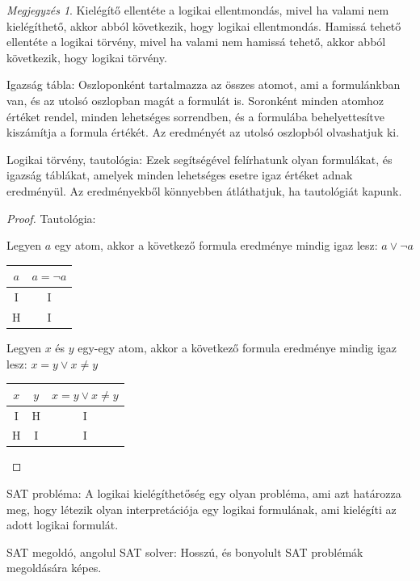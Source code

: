 \documentclass[
]{thesis-ekf}
\theoremstyle{definition}
\theoremstyle{remark}
\newtheorem{megjegyzes}[tetel]{Megjegyzés}
\begin{document}
	\begin{megjegyzes}
		Kielégítő ellentéte a logikai ellentmondás, mivel ha valami nem kielégíthető, akkor abból következik, hogy logikai ellentmondás.
		Hamissá tehető ellentéte a logikai törvény, mivel ha valami nem hamissá tehető, akkor abból következik, hogy logikai törvény.
	\end{megjegyzes}

	Igazság tábla: Oszloponként tartalmazza az összes atomot, ami a formulánkban van, és az utolsó oszlopban magát a formulát is. Soronként minden atomhoz értéket rendel, minden lehetséges sorrendben, és a formulába behelyettesítve kiszámítja a formula értékét. Az eredményét az utolsó oszlopból olvashatjuk ki.
	
	Logikai törvény, tautológia: Ezek segítségével felírhatunk olyan formulákat, és igazság táblákat, amelyek minden lehetséges esetre igaz értéket adnak eredményül. Az eredményekből könnyebben átláthatjuk, ha tautológiát kapunk.
	
	\begin{proof}\label{biz-tautologia}
		Tautológia: 
			
		Legyen $ a $ egy atom, akkor a következő formula eredménye mindig igaz lesz: $ a\vee\neg a $
		
		\begin{tabular}{|c|c|}
			\hline
			$ a $ & $ a=\neg a $ \\
			\hline
			I & I \\
			\hline
			H & I \\
			\hline
		\end{tabular}
	
		Legyen $ x $ és $ y $ egy-egy atom, akkor a következő formula eredménye mindig igaz lesz: $ x=y\vee x\ne y $
		
		\begin{tabular}{|c|c|c|}
			\hline
			$ x $ & $ y $ & $ x=y\vee x\ne y $ \\
			\hline
			I & H & I \\
			\hline
			H & I & I \\
			\hline
		\end{tabular}
	\end{proof}
	
	\textsc{SAT} probléma: A logikai kielégíthetőség egy olyan probléma, ami azt határozza meg, hogy létezik olyan interpretációja egy logikai formulának, ami kielégíti az adott logikai formulát.
	
	\textsc{SAT} megoldó, angolul \textsc{SAT} solver: Hosszú, és bonyolult \textsc{SAT} problémák megoldására képes. %
\end{document}
